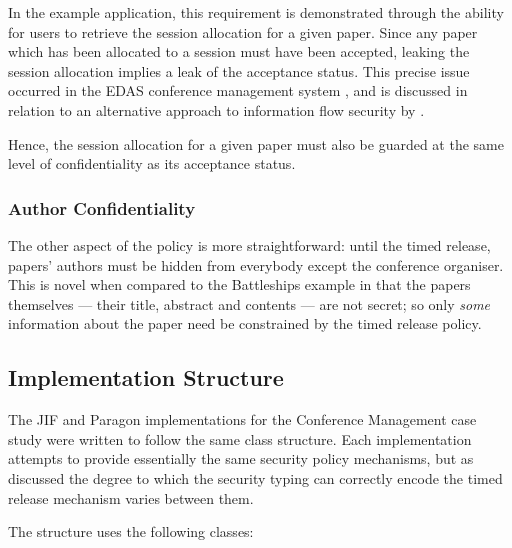In the example application, this requirement is demonstrated through the ability for users to retrieve the session allocation for a given paper. Since any paper which has been allocated to a session must have been accepted, leaking the session allocation implies a leak of the acceptance status. This precise issue occurred in the EDAS conference management system \cite{agrawal2016edas_conf}, and is discussed in relation to an alternative approach to information flow security by \citeauthor{polikarpova2016lifty} \cite{polikarpova2016lifty}.

Hence, the session allocation for a given paper must also be guarded at the same level of confidentiality as its acceptance status.

\subsubsection{Author Confidentiality}

The other aspect of the policy is more straightforward: until the timed release, papers' authors must be hidden from everybody except the conference organiser. This is novel when compared to the Battleships example in that the papers themselves --- their title, abstract and contents --- are not secret; so only \textit{some} information about the paper need be constrained by the timed release policy.

\newpage

\subsection{Implementation Structure}

The JIF and Paragon implementations for the Conference Management case study were written to follow the same class structure. Each implementation attempts to provide essentially the same security policy mechanisms, but as discussed the degree to which the security typing can correctly encode the timed release mechanism varies between them.

The structure uses the following classes:

